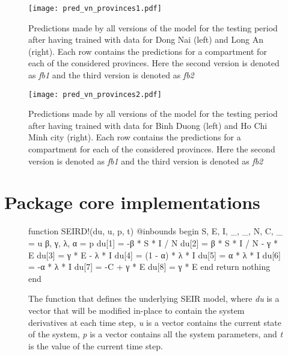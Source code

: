 \begin{figure}[!htb]
    \centering
    \texttt{[image: pred\_vn\_provinces1.pdf]}
    \caption[Model forecast for Vietnam provinces 1]{Predictions made by all versions of the model for the testing period after having trained with data for Dong Nai (left) and Long An (right). Each row contains the predictions for a compartment for each of the considered provinces. Here the second version is denoted as \textit{fb1} and the third version is denoted as \textit{fb2}}
    \label{fig:pred-vn-provinces1}
\end{figure}


\begin{figure}[!htb]
    \centering
    \texttt{[image: pred\_vn\_provinces2.pdf]}
    \caption[Model forecast for Vietnam provinces 2]{Predictions made by all versions of the model for the testing period after having trained with data for Binh Duong (left) and Ho Chi Minh city (right). Each row contains the predictions for a compartment for each of the considered provinces. Here the second version is denoted as \textit{fb1} and the third version is denoted as \textit{fb2}}
    \label{fig:pred-vn-provinces2}
\end{figure}

\chapter{Package core implementations}

\begin{figure}[!htb]
\centering
\begin{jllisting}
function SEIRD!(du, u, p, t)
    @inbounds begin
        S, E, I, _, _, N, C, _ = u
        β, γ, λ, α = p
        du[1] = -β * S * I / N
        du[2] = β * S * I / N - γ * E
        du[3] = γ * E - λ * I
        du[4] = (1 - α) * λ * I
        du[5] = α * λ * I
        du[6] = -α * λ * I
        du[7] = -C + γ * E
        du[8] = γ * E
    end
    return nothing
end
\end{jllisting}
\caption[Julia implementation of the basic SEIR model]{The function that defines the underlying SEIR model, where \textit{du} is a vector that will be modified in-place to contain the system derivatives at each time step, \textit{u} is a vector contains the current state of the system, \textit{p} is a vector contains all the system parameters, and \textit{t} is the value of the current time step.}
\label{fig:diffeq-seird-inplace}
\end{figure}


